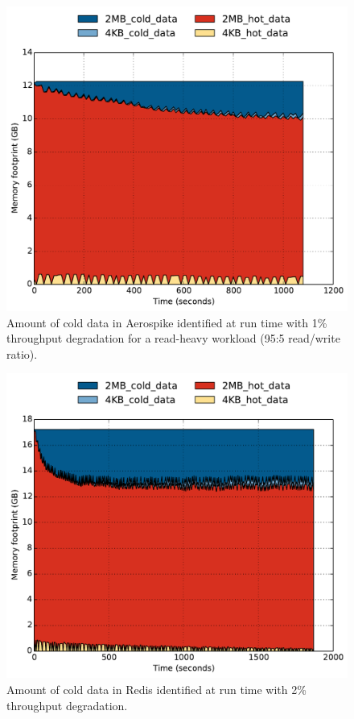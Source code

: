 \begin{figure}[t]
\centering
\includegraphics[width=0.8\columnwidth]{asplos2017/figures/aero-new-policy-24perSlow-capacity_over_time.pdf}
\caption{Amount of cold data in Aerospike identified at run time with 1\%
throughput degradation for a read-heavy workload (95:5 read/write ratio).}
\label{fig:aerospike-capacity}
\end{figure}

\begin{figure}[t]
\centering
\includegraphics[width=0.8\columnwidth]{asplos2017/figures/redis-skewed-kstaled5-sample5-capacity_over_time.pdf}
\caption{Amount of cold data in Redis identified at run time with 2\%
throughput degradation.}
\label{fig:redis-skewed-hotspot-capacity}
\end{figure}

